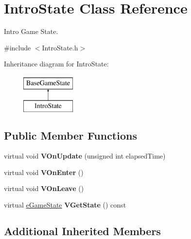 \hypertarget{classIntroState}{\section{Intro\-State Class Reference}
\label{classIntroState}
}


Intro Game State.  




{\ttfamily \#include $<$Intro\-State.\-h$>$}

Inheritance diagram for Intro\-State\-:\begin{figure}[H]
\begin{center}
\leavevmode
\includegraphics[height=2.000000cm]{classIntroState}
\end{center}
\end{figure}
\subsection*{Public Member Functions}
\begin{DoxyCompactItemize}
\item 
\hypertarget{classIntroState_aef0cae3ebbcf9cb6ab47905ca82e0754}{virtual void {\bfseries V\-On\-Update} (unsigned int elapsed\-Time)}\label{classIntroState_aef0cae3ebbcf9cb6ab47905ca82e0754}

\item 
\hypertarget{classIntroState_ab9d218f2d2f3952b0ceb394569c70313}{virtual void {\bfseries V\-On\-Enter} ()}\label{classIntroState_ab9d218f2d2f3952b0ceb394569c70313}

\item 
\hypertarget{classIntroState_a127791d0e493a990d8df5bcf72f307ce}{virtual void {\bfseries V\-On\-Leave} ()}\label{classIntroState_a127791d0e493a990d8df5bcf72f307ce}

\item 
\hypertarget{classIntroState_a036c3331a7ddf7f01a00f2258615b1e1}{virtual \hyperlink{BaseGameState_8h_ae12dcfc1b1e01980b11e116e3af6807f}{e\-Game\-State} {\bfseries V\-Get\-State} () const }\label{classIntroState_a036c3331a7ddf7f01a00f2258615b1e1}

\end{DoxyCompactItemize}
\subsection*{Additional Inherited Members}


